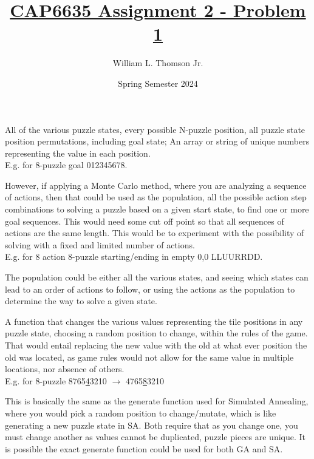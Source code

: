 \documentclass[12pt]{article}
\title{\vspace{-50pt}\textbf{\underline{CAP6635 Assignment 2 - Problem 1}}}
\author{William L. Thomson Jr.}
\date{Spring Semester 2024}
\begin{document}
\maketitle

\begin{description}[itemsep=1em]
	\item[What does a population represent in this case?] \hfill \break
		All of the various puzzle states, every possible N-puzzle position, all puzzle state
		position permutations, including goal state; An array or string of unique numbers
		representing the value in each position. \\
		E.g. for 8-puzzle goal 012345678.

        However, if applying a Monte Carlo method, where you are analyzing a sequence
        of actions, then that could be used as the population, all the possible action step
        combinations to solving a puzzle based on a given start state, to find one or more
        goal sequences. This would need some cut off point so that all sequences of
        actions are the same length. This would be to experiment with the possibility 
        of solving with a fixed and limited number of actions. \\
		E.g. for 8 action 8-puzzle starting/ending in empty 0,0 LLUURRDD.

        The population could be either all the various states, and seeing which states
        can lead to an order of actions to follow, or using the actions as the population
        to determine the way to solve a given state.

	\item[What is your mutation function?] \hfill \break
		A function that changes the various values representing the tile positions in any puzzle
		state, choosing a random position to change, within the rules of the game. That would
		entail replacing the new value with the old at what ever position the old was located,
		as game rules would not allow for the same value in multiple locations, nor absence
		of others. \\
		E.g. for 8-puzzle 8765\underline{4}3210 $\rightarrow$ 4765\underline{8}3210

        This is basically the same as the generate function used for Simulated Annealing,
        where you would pick a random position to change/mutate, which is like generating
        a new puzzle state in SA. Both require that as you change one, you must change
        another as values cannot be duplicated, puzzle pieces are unique. It is possible
        the exact generate function could be used for both GA and SA.


\end{description}
\end{document}
